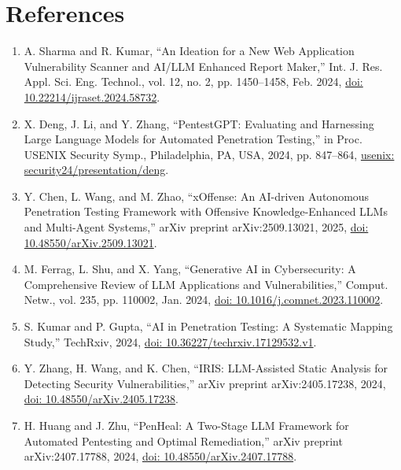 \documentclass[journal]{IEEEtran}
\begin{document}
\section*{References}
\begin{enumerate}

\item A. Sharma and R. Kumar, “An Ideation for a New Web Application Vulnerability Scanner and AI/LLM Enhanced Report Maker,” Int. J. Res. Appl. Sci. Eng. Technol., vol. 12, no. 2, pp. 1450–1458, Feb. 2024, \href{https://doi.org/10.22214/ijraset.2024.58732}{doi: 10.22214/ijraset.2024.58732}.

\item X. Deng, J. Li, and Y. Zhang, “PentestGPT: Evaluating and Harnessing Large Language Models for Automated Penetration Testing,” in Proc. USENIX Security Symp., Philadelphia, PA, USA, 2024, pp. 847--864, \href{https://www.usenix.org/conference/usenixsecurity24/presentation/deng}{usenix: security24/presentation/deng}.

\item Y. Chen, L. Wang, and M. Zhao, “xOffense: An AI-driven Autonomous Penetration Testing Framework with Offensive Knowledge-Enhanced LLMs and Multi-Agent Systems,” arXiv preprint arXiv:2509.13021, 2025, \href{https://doi.org/10.48550/arXiv.2509.13021}{doi: 10.48550/arXiv.2509.13021}.

\item M. Ferrag, L. Shu, and X. Yang, “Generative AI in Cybersecurity: A Comprehensive Review of LLM Applications and Vulnerabilities,” Comput. Netw., vol. 235, pp. 110002, Jan. 2024, \href{https://doi.org/10.1016/j.comnet.2023.110002}{doi: 10.1016/j.comnet.2023.110002}.

\item S. Kumar and P. Gupta, “AI in Penetration Testing: A Systematic Mapping Study,” TechRxiv, 2024, \href{https://doi.org/10.36227/techrxiv.17129532.v1}{doi: 10.36227/techrxiv.17129532.v1}.

\item Y. Zhang, H. Wang, and K. Chen, “IRIS: LLM-Assisted Static Analysis for Detecting Security Vulnerabilities,” arXiv preprint arXiv:2405.17238, 2024, \href{https://doi.org/10.48550/arXiv.2405.17238}{doi: 10.48550/arXiv.2405.17238}.

\item H. Huang and J. Zhu, “PenHeal: A Two-Stage LLM Framework for Automated Pentesting and Optimal Remediation,” arXiv preprint arXiv:2407.17788, 2024, \href{https://doi.org/10.48550/arXiv.2407.17788}{doi: 10.48550/arXiv.2407.17788}.


\end{enumerate}
\end{document}
